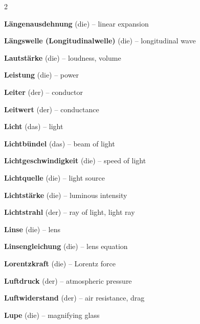 \begin{multicols}{2}
\par\nopagebreak
\textbf{Längenausdehnung} (die) -- linear expansion\dotfill\hyperref[e:139]{\pageref*{e:139}}\par
\textbf{Längswelle (Longitudinalwelle)} (die) -- longitudinal wave\dotfill\hyperref[e:206]{\pageref*{e:206}}\par
\textbf{Lautstärke} (die) -- loudness, volume\dotfill\hyperref[e:215]{\pageref*{e:215}}\par
\textbf{Leistung} (die) -- power\dotfill\hyperref[e:105]{\pageref*{e:105}}\par
\textbf{Leiter} (der) -- conductor\dotfill\hyperref[e:150]{\pageref*{e:150}}\par
\textbf{Leitwert} (der) -- conductance\dotfill\hyperref[e:149]{\pageref*{e:149}}\par
\textbf{Licht} (das) -- light\dotfill\hyperref[e:220]{\pageref*{e:220}}\par
\textbf{Lichtbündel} (das) -- beam of light\dotfill\hyperref[e:223]{\pageref*{e:223}}\par
\textbf{Lichtgeschwindigkeit} (die) -- speed of light\dotfill\hyperref[e:224]{\pageref*{e:224}}\par
\textbf{Lichtquelle} (die) -- light source\dotfill\hyperref[e:221]{\pageref*{e:221}}\par
\textbf{Lichtstärke} (die) -- luminous intensity\dotfill\hyperref[e:257]{\pageref*{e:257}}\par
\textbf{Lichtstrahl} (der) -- ray of light, light ray\dotfill\hyperref[e:222]{\pageref*{e:222}}\par
\textbf{Linse} (die) -- lens\dotfill\hyperref[e:240]{\pageref*{e:240}}\par
\textbf{Linsengleichung} (die) -- lens equation\dotfill\hyperref[e:248]{\pageref*{e:248}}\par
\textbf{Lorentzkraft} (die) -- Lorentz force\dotfill\hyperref[e:185]{\pageref*{e:185}}\par
\textbf{Luftdruck} (der) -- atmospheric pressure\dotfill\hyperref[e:91]{\pageref*{e:91}}\par
\textbf{Luftwiderstand} (der) -- air resistance, drag\dotfill\hyperref[e:69]{\pageref*{e:69}}\par
\textbf{Lupe} (die) -- magnifying glass\dotfill\hyperref[e:253]{\pageref*{e:253}}\par


\end{multicols}
